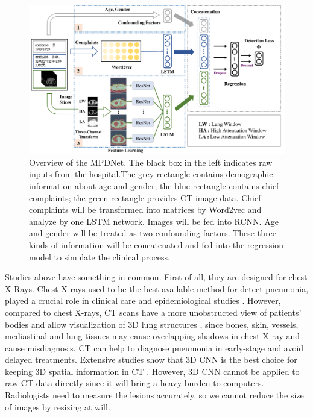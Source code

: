 \documentclass[journal]{IEEEtran}
\begin{document}
\begin{figure}[htbp]
    \centerline{\includegraphics[width=160mm]{MPD2.pdf}}
    \vspace{-0cm}
    \caption{Overview of the MPDNet. The black box in the left indicates raw inputs from the hospital.The grey rectangle contains demographic information about age and gender; the blue rectangle contains chief complaints; the green rectangle provides CT image data. Chief complaints will be transformed into matrices by Word2vec and analyze by one LSTM network. Images will be fed into RCNN. Age and gender will be treated as two confounding factors. These three kinds of information will be concatenated and fed into the regression model to simulate the clinical process.}
    \vspace{-0cm}
    \label{architecture}

    \end{figure}

Studies above have something in common. First of all, they are designed for chest X-Rays. Chest X-rays used to be the best available method for detect pneumonia, played a crucial role in clinical care and epidemiological studies \cite{Franquet2001Imaging, Thomas2005Standardized}. 
However, compared to chest X-rays, CT scans have a more unobstructed view of patients' bodies and allow visualization of 3D lung structures \cite{korfiatis2009texture}, since bones, skin, vessels, mediastinal and lung tissues may cause overlapping shadows in chest X-ray and cause misdiagnosis. CT can help to diagnose pneumonia in early-stage and avoid delayed treatments.
Extensive studies show that 3D CNN is the best choice for keeping 3D spatial information in CT \cite{Yorozu1987Electron}. However, 3D CNN cannot be applied to raw CT data directly since it will bring a heavy burden to computers. Radiologists need to measure the lesions accurately, so we cannot reduce the size of images by resizing at will.
\end{document}
